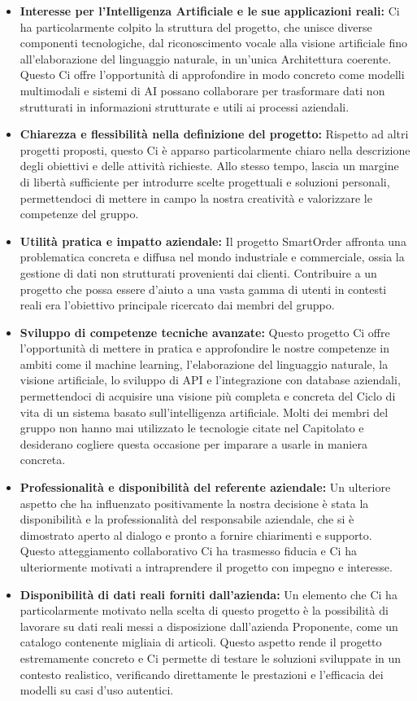 \documentclass[a4paper,12pt]{article}
\begin{document}
\begin{itemize}
    \item \textbf{Interesse per l’Intelligenza Artificiale e le sue applicazioni reali:} Ci ha particolarmente colpito la struttura del progetto, che unisce diverse componenti tecnologiche, dal riconoscimento vocale alla visione artificiale fino all’elaborazione del linguaggio naturale, in un’unica Architettura coerente. Questo Ci offre l’opportunità di approfondire in modo concreto come modelli multimodali e sistemi di AI possano collaborare per trasformare dati non strutturati in informazioni strutturate e utili ai processi aziendali.
    \item \textbf{Chiarezza e flessibilità nella definizione del progetto:} Rispetto ad altri progetti proposti, questo Ci è apparso particolarmente chiaro nella descrizione degli obiettivi e delle attività richieste. Allo stesso tempo, lascia un margine di libertà sufficiente per introdurre scelte progettuali e soluzioni personali, permettendoci di mettere in campo la nostra creatività e valorizzare le competenze del gruppo.
    \item \textbf{Utilità pratica e impatto aziendale:} Il progetto SmartOrder affronta una problematica concreta e diffusa nel mondo industriale e commerciale, ossia la gestione di dati non strutturati provenienti dai clienti. Contribuire a un progetto che possa essere d’aiuto a una vasta gamma di utenti in contesti reali era l’obiettivo principale ricercato dai membri del gruppo.
    \item \textbf{Sviluppo di competenze tecniche avanzate:} Questo progetto Ci offre l’opportunità di mettere in pratica e approfondire le nostre competenze in ambiti come il machine learning, l’elaborazione del linguaggio naturale, la visione artificiale, lo sviluppo di API e l’integrazione con database aziendali, permettendoci di acquisire una visione più completa e concreta del Ciclo di vita di un sistema basato sull’intelligenza artificiale. Molti dei membri del gruppo non hanno mai utilizzato le tecnologie citate nel Capitolato e desiderano cogliere questa occasione per imparare a usarle in maniera concreta.
    \item \textbf{Professionalità e disponibilità del referente aziendale:} Un ulteriore aspetto che ha influenzato positivamente la nostra decisione è stata la disponibilità e la professionalità del responsabile aziendale, che si è dimostrato aperto al dialogo e pronto a fornire chiarimenti e supporto. Questo atteggiamento collaborativo Ci ha trasmesso fiducia e Ci ha ulteriormente motivati a intraprendere il progetto con impegno e interesse.
    \item \textbf{Disponibilità di dati reali forniti dall’azienda:} Un elemento che Ci ha particolarmente motivato nella scelta di questo progetto è la possibilità di lavorare su dati reali messi a disposizione dall’azienda Proponente, come un catalogo contenente migliaia di articoli. Questo aspetto rende il progetto estremamente concreto e Ci permette di testare le soluzioni sviluppate in un contesto realistico, verificando direttamente le prestazioni e l’efficacia dei modelli su casi d’uso autentici.
\end{itemize}
\end{document}
